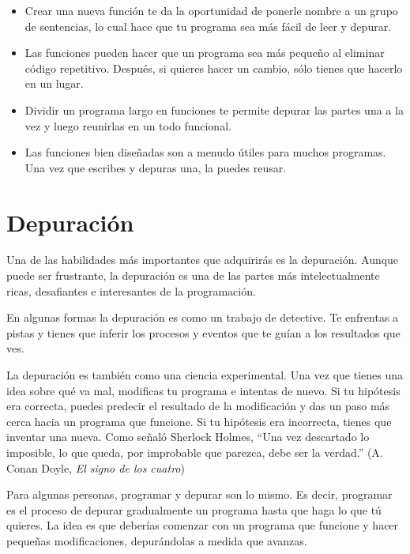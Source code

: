 \documentclass[10pt]{book}
\begin{document}
\begin{itemize}

\item Crear una nueva función te da la oportunidad de ponerle nombre a un grupo
de sentencias, lo cual hace que tu programa sea más fácil de leer y depurar.

\item Las funciones pueden hacer que un programa sea más pequeño al eliminar código
repetitivo.  Después, si quieres hacer un cambio, sólo tienes
que hacerlo en un lugar.

\item Dividir un programa largo en funciones te permite depurar las
partes una a la vez y luego reunirlas en un todo funcional.

\item Las funciones bien diseñadas son a menudo útiles para muchos programas.
Una vez que escribes y depuras una, la puedes reusar.

\end{itemize}


\section{Depuración}

Una de las habilidades más importantes que adquirirás es la depuración.
Aunque puede ser frustrante, la depuración es una de las partes más
intelectualmente ricas, desafiantes e interesantes de
la programación.

En algunas formas la depuración es como un trabajo de detective.  Te enfrentas
a pistas y tienes que inferir los procesos y eventos que te guían
a los resultados que ves.

La depuración es también como una ciencia experimental.  Una vez que tienes una idea
sobre qué va mal, modificas tu programa e intentas de nuevo.  Si
tu hipótesis era correcta, puedes predecir el resultado de la
modificación y das un paso más cerca hacia un programa que funcione.  Si
tu hipótesis era incorrecta, tienes que inventar una nueva.  Como
señaló Sherlock Holmes, ``Una vez descartado lo
imposible, lo que queda, por improbable que parezca, debe ser la verdad.''
(A. Conan Doyle, {\em El signo de los cuatro})

Para algunas personas, programar y depurar son lo mismo.  Es
decir, programar es el proceso de depurar gradualmente un programa hasta que
haga lo que tú quieres.  La idea es que deberías comenzar con un
programa que funcione y hacer pequeñas modificaciones,
depurándolas a medida que avanzas.
\end{document}
